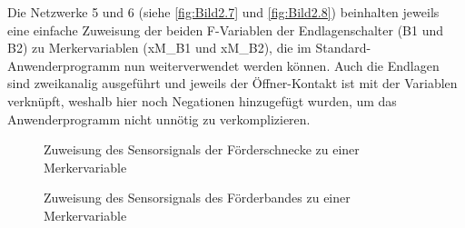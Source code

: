 Die Netzwerke 5 und 6 (siehe \autoref{fig:Bild2.7} und \autoref{fig:Bild2.8}) beinhalten jeweils eine einfache Zuweisung der beiden F-Variablen der Endlagenschalter (B1 und B2) zu Merkervariablen (xM\_B1 und xM\_B2), die im Standard- Anwenderprogramm nun weiterverwendet werden können. Auch die Endlagen sind zweikanalig ausgeführt und jeweils der Öffner-Kontakt ist mit der Variablen verknüpft, weshalb hier noch Negationen hinzugefügt wurden, um das Anwenderprogramm nicht unnötig zu verkomplizieren.

\begin{figure}[H]
   \centering
   \caption[Merker Endlage Förderschnecke]{Zuweisung des Sensorsignals der Förderschnecke zu einer Merkervariable}
   \label{fig:Bild2.7}
\end{figure}

\begin{figure}[H]
   \centering
   \caption[Merker Endlage Förderband]{Zuweisung des Sensorsignals des Förderbandes zu einer Merkervariable}
   \label{fig:Bild2.8}
\end{figure}


